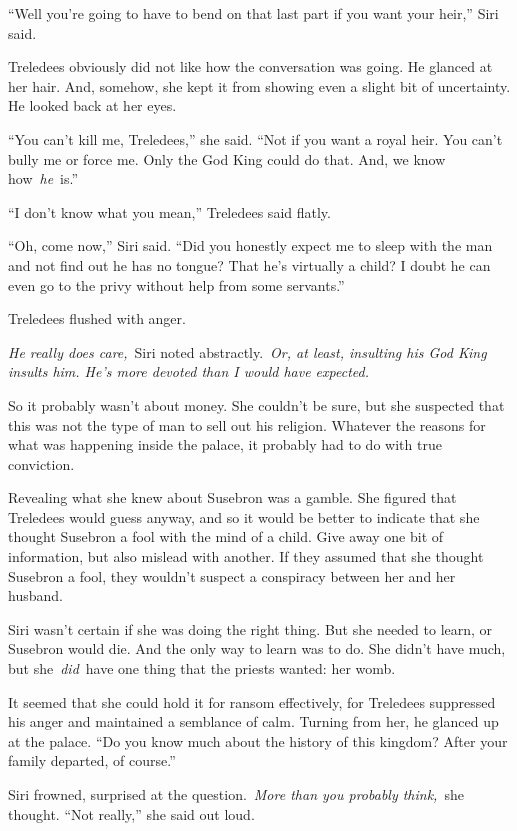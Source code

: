 “Well you’re going to have to bend on that last part if you want your heir,” Siri said.

Treledees obviously did not like how the conversation was going. He glanced at her hair. And, somehow, she kept it from showing even a slight bit of uncertainty. He looked back at her eyes.

“You can’t kill me, Treledees,” she said. “Not if you want a royal heir. You can’t bully me or force me. Only the God King could do that. And, we know how~\textit{he}~is.”

“I don’t know what you mean,” Treledees said flatly.

“Oh, come now,” Siri said. “Did you honestly expect me to sleep with the man and not find out he has no tongue? That he’s virtually a child? I doubt he can even go to the privy without help from some servants.”

Treledees flushed with anger.

\textit{He really does care,}~Siri noted abstractly.~\textit{Or, at least, insulting his God King insults him. He’s more devoted than I would have expected.}

So it probably wasn’t about money. She couldn’t be sure, but she suspected that this was not the type of man to sell out his religion. Whatever the reasons for what was happening inside the palace, it probably had to do with true conviction.

Revealing what she knew about Susebron was a gamble. She figured that Treledees would guess anyway, and so it would be better to indicate that she thought Susebron a fool with the mind of a child. Give away one bit of information, but also mislead with another. If they assumed that she thought Susebron a fool, they wouldn’t suspect a conspiracy between her and her husband.

Siri wasn’t certain if she was doing the right thing. But she needed to learn, or Susebron would die. And the only way to learn was to do. She didn’t have much, but she~\textit{did}~have one thing that the priests wanted: her womb.

It seemed that she could hold it for ransom effectively, for Treledees suppressed his anger and maintained a semblance of calm. Turning from her, he glanced up at the palace. “Do you know much about the history of this kingdom? After your family departed, of course.”

Siri frowned, surprised at the question.~\textit{More than you probably think,}~she thought. “Not really,” she said out loud.

